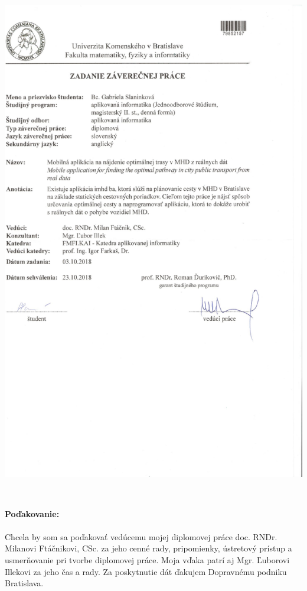 \documentclass[12pt, oneside]{book}
\begin{document}
\newpage 
\thispagestyle{empty}
\hspace{-0.7cm}\includegraphics[width=1.1\textwidth]{images/zadanie-cut}


\frontmatter

\setcounter{page}{3}
\newpage 
~

\vfill
{\bf Poďakovanie:}
\\ \\
Chcela by som sa poďakovať vedúcemu mojej diplomovej práce doc. RNDr. Milanovi Ftáčnikovi, CSc. za jeho cenné rady, pripomienky, ústretový prístup a usmerňovanie pri
tvorbe diplomovej práce. Moja vďaka patrí aj Mgr. Ľuborovi Illekovi za jeho čas a rady. Za poskytnutie dát ďakujem Dopravnému podniku Bratislava.
\end{document}
